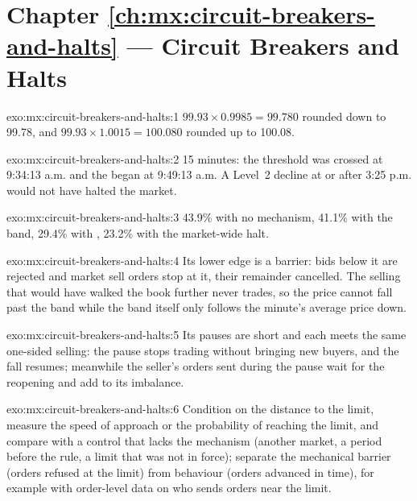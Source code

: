 \section*{Chapter \ref{ch:mx:circuit-breakers-and-halts} --- Circuit Breakers and Halts}

\begin{solution}{exo:mx:circuit-breakers-and-halts:1}
$99.93\times0.9985=99.780$ rounded down to 99.78, and $99.93\times1.0015=100.080$ rounded up to 100.08.
\end{solution}

\begin{solution}{exo:mx:circuit-breakers-and-halts:2}
15 minutes: the threshold was crossed at 9:34:13 a.m. and the  began at 9:49:13 a.m. A Level~2 decline at or after 3:25 p.m. would not
have halted the market.
\end{solution}

\begin{solution}{exo:mx:circuit-breakers-and-halts:3}
43.9\% with no mechanism, 41.1\% with the band, 29.4\% with , 23.2\% with the market-wide halt.
\end{solution}

\begin{solution}{exo:mx:circuit-breakers-and-halts:4}
Its lower edge is a barrier: bids below it are rejected and market sell orders stop at it, their remainder cancelled. The selling that would have walked
the book further never trades, so the price cannot fall past the band while the band itself only follows the minute's average price down.
\end{solution}

\begin{solution}{exo:mx:circuit-breakers-and-halts:5}
Its pauses are short and each  meets the same one-sided selling: the pause stops trading without bringing new buyers, and the fall
resumes; meanwhile the seller's orders sent during the pause wait for the reopening and add to its imbalance.
\end{solution}

\begin{solution}{exo:mx:circuit-breakers-and-halts:6}
Condition on the distance to the limit, measure the speed of approach or the probability of reaching the limit, and compare with a control that
lacks the mechanism (another market, a period before the rule, a limit that was not in force); separate the mechanical barrier (orders refused at the
limit) from behaviour (orders advanced in time), for example with order-level data on who sends orders near the limit.
\end{solution}

